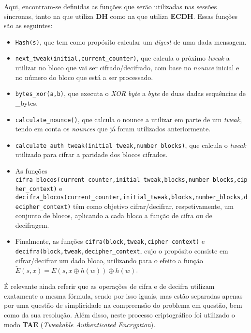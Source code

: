 \documentclass[11pt]{article}
\begin{document}
    Aqui, encontram-se definidas as funções que serão utilizadas nas
sessões síncronas, tanto na que utiliza \textbf{DH} como na que utiliza
\textbf{ECDH}. Essas funções são as seguintes:

\begin{itemize}
\item
  \texttt{Hash(s)}, que tem como propósito calcular um \emph{digest} de
  uma dada mensagem.
\item
  \texttt{next\_tweak(initial,current\_counter)}, que calcula o próximo \emph{tweak} a utilizar no bloco que vai ser
  cifrado/decifrado, com base no \emph{nounce} inicial e no número do
  bloco que está a ser processado.
\item
  \texttt{bytes\_xor(a,b)}, que executa o \emph{XOR}
  \emph{byte} a \emph{byte} de duas dadas sequências de \_bytes.
\item
  \texttt{calculate\_nounce()}, que calcula o nounce
  a utilizar em parte de um \emph{tweak}, tendo em conta os
  \emph{nounces} que já foram utilizados anteriormente.
\item
  \texttt{calculate\_auth\_tweak(initial\_tweak,number\_blocks)}, que
  calcula o \emph{tweak} utilizado para cifrar a
  paridade dos blocos cifrados.
\item
  As funções
  \texttt{cifra\_blocos(current\_counter,initial\_tweak,blocks,number\_blocks,cipher\_context)}
  e
  \texttt{decifra\_blocos(current\_counter,initial\_tweak,blocks,number\_blocks,decipher\_context)}
  têm como objetivo cifrar/decifrar, respetivamente, um conjunto de
  blocos, aplicando a cada bloco a função de cifra ou de decifragem.
\item
  Finalmente, as funções \texttt{cifra(block,tweak,cipher\_context)} e
  \texttt{decifra(block,tweak,decipher\_context}, cujo o propósito consiste em
  cifrar/decifrar um dado bloco, utilizando para o efeito a função
  $\tilde{E}(s,x) = E(s,x \oplus h(w)) \oplus h(w)$.
\end{itemize}

É relevante ainda referir que as operações de cifra e de decifra utilizam
exatamente a mesma fórmula, sendo por isso iguais, mas estão separadas
apenas por uma questão de simplicidade na compreensão do problema em
questão, bem como da sua resolução. Além disso, neste processo
criptográfico foi utilizado o modo \textbf{TAE} (\emph{Tweakable
Authenticated Encryption}).
\end{document}
